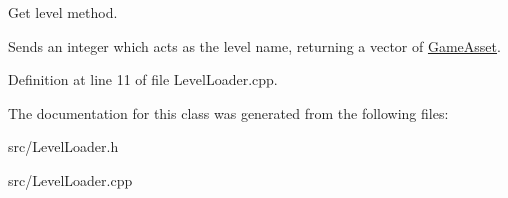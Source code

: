 Get level method. 

Sends an integer which acts as the level name, returning a vector of \hyperlink{classGameAsset}{Game\-Asset}. 

Definition at line 11 of file Level\-Loader.\-cpp.



The documentation for this class was generated from the following files\-:\begin{DoxyCompactItemize}
\item 
src/Level\-Loader.\-h\item 
src/Level\-Loader.\-cpp\end{DoxyCompactItemize}
